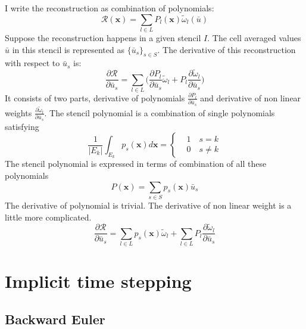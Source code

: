 \documentclass[smallextended]{svjour3}       %
\newcommand{\bfx}{{\mathbf x}}
\begin{document}
I write the reconstruction as combination of polynomials:
\begin{equation}\label{eq:weno}
		  \mathscr{R}(\bfx) = \sum_{l\in L} P_l(\bfx) \tilde\omega_l(\bar u)
\end{equation}
Suppose the reconstruction happens in a given stencil $I$. 
The cell averaged values $\bar u$ in this stencil is represented as $\{\bar u_s\}_{s \in S}$.
The derivative of this reconstruction with respect to $\bar u_s$ is:
\begin{equation}
		  \frac{\partial \mathscr{R}}{\partial \bar u_s} = 
		  \sum_{l \in L} \Big(\frac{\partial P_l}{\partial \bar u_s}\tilde \omega_l + P_l\frac{\partial \tilde \omega_l}{\partial \bar u_s}\Big) 
\end{equation}
It consists of two parts, derivative of polynomials $\frac{\partial P_l}{\partial \bar u_s}$ and 
derivative of non linear weights $\frac{\partial \tilde \omega_l}{\partial \bar u_s}$.
The stencil polynomial is a combination of single polynomials satisfying 
\begin{equation}\label{eq:spolyn}
		  \frac{1}{|E_k|} \int_{E_k} p_s(\bfx) d\bfx = \left \{ 
		  \begin{aligned}
					 &1 \quad s=k\\
					 &0 \quad s\neq k
		  \end{aligned}\right .
\end{equation}
The stencil polynomial is expressed in terms of combination of all these polynomials
\begin{equation}\label{eq:Spolyn}
		  P(\bfx) = \sum_{s\in S} p_s(\bfx) \bar u_s
\end{equation}
The derivative of polynomial is trivial. The derivative of non linear weight is 
a little more complicated.
\begin{equation}\label{eq:derivative}
		  \frac{\partial \mathscr{R}}{\partial \bar u_s} = \sum_{l \in L} p_s(\bfx) \tilde \omega_l + 
		  \sum_{l\in L} P_l\frac{\partial \tilde \omega_l}{\partial \bar u_s}
\end{equation}


\section{Implicit time stepping}

\subsection{Backward Euler}
\end{document}
